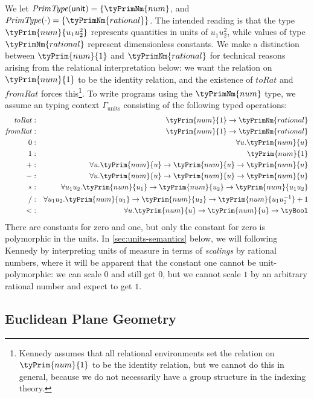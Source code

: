 We let $\mathit{PrimType}(\mathsf{unit}) = \{\tyPrimNm{num}$, and
$\mathit{PrimType}(\cdot) = \{\tyPrimNm{rational}\}$. The intended
reading is that the type $\tyPrim{num}{u_1u^2_2}$ represents
quantities in units of $u_1u^2_2$, while values of type
$\tyPrimNm{rational}$ represent dimensionless constants. We make a
distinction between $\tyPrim{num}{1}$ and $\tyPrimNm{rational}$ for
technical reasons arising from the relational interpretation below: we
want the relation on $\tyPrim{num}{1}$ to be the identity relation,
and the existence of $\mathit{toRat}$ and $\mathit{fromRat}$ forces
this\footnote{Kennedy assumes that all relational environments set the
  relation on $\tyPrim{num}{1}$ to be the identity relation, but we
  cannot do this in general, because we do not necessarily have a
  group structure in the indexing theory.}. To write programs using
the $\tyPrimNm{num}$ type, we assume an typing context
$\Gamma_{\textrm{units}}$ consisting of the following typed
operations:
\begin{eqnarray*}
  \mathit{toRat} & : & \tyPrim{num}{1} \to \tyPrimNm{rational} \\
  \mathit{fromRat} & : & \tyPrim{num}{1} \to \tyPrimNm{rational} \\
  0 & : & \forall u. \tyPrim{num}{u} \\
  1 & : & \tyPrim{num}{1} \\
  + & : & \forall u. \tyPrim{num}{u} \to \tyPrim{num}{u} \to \tyPrim{num}{u} \\
  - & : & \forall u. \tyPrim{num}{u} \to \tyPrim{num}{u} \to \tyPrim{num}{u} \\
  * & : & \forall u_1 u_2. \tyPrim{num}{u_1} \to \tyPrim{num}{u_2} \to \tyPrim{num}{u_1u_2} \\
  / & : & \forall u_1 u_2. \tyPrim{num}{u_1} \to \tyPrim{num}{u_2} \to \tyPrim{num}{u_1u_2^{-1}} + 1 \\
  < & : & \forall u. \tyPrim{num}{u} \to \tyPrim{num}{u} \to \tyBool
\end{eqnarray*}
There are constants for zero and one, but only the constant for zero
is polymorphic in the units. In \autoref{sec:units-semantics} below,
we will following Kennedy by interpreting units of measure in terms of
\emph{scalings} by rational numbers, where it will be apparent that
the constant one cannot be unit-polymorphic: we can scale $0$ and
still get $0$, but we cannot scale $1$ by an arbitrary rational number
and expect to get $1$.

\subsection{Euclidean Plane Geometry}\label{sec:2d-example}

